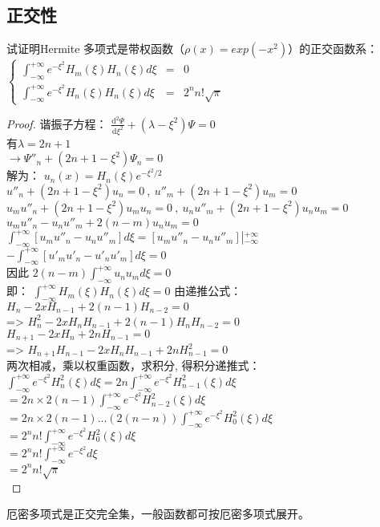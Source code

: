 \subsection{正交性}
\begin{example} %
试证明Hermite 多项式是带权函数（$\rho(x) =exp(-x^2)$）的正交函数系：\\
{$ \displaystyle  
	\left\{  
	\begin{array}{ccccc}
		\int_{-\infty}^{+\infty} e^{-\xi^{2}} H_m(\xi) H_n(\xi)d\xi &=&0 ~~~~~~\\
		\int_{-\infty}^{+\infty} e^{-\xi^{2}} H_n(\xi) H_n(\xi)d\xi &=&2^n n! \sqrt{\pi}  
	\end{array}
	\right.  
	$} 
\end{example} 
\begin{proof} %
谐振子方程：{ $ \displaystyle \frac{\mathrm{d} ^2\Psi}{\mathrm{d} \xi^2} + \left( \lambda - \xi^2 \right) \Psi=0  $  }  \\
有$\lambda=2n+1 $~\\
$\to   \Psi''_n +(2n+1-\xi^2) \Psi_n =0$ \\
解为： $u_n(x)=H_n(\xi) e^{-\xi^{2}/2}$ \\
$u''_n+ (2n+1-\xi^2) u_n =0    ~, ~u''_m+ (2n+1-\xi^2) u_m =0  $\\
$u_mu''_n +(2n+1-\xi^2) u_mu_n =0    ~, ~u_nu''_m + (2n+1-\xi^2) u_nu_m =0  $  \\ 
$u_mu''_n -u_nu''_m +2(n-m)u_nu_m=0 $\\ 
$ \int_{-\infty}^{+\infty} [u_mu''_n -u_nu''_m] d\xi  = [u_mu''_n -u_nu''_m] \left |_{-\infty} ^{+\infty}  \right. $
$-\int_{-\infty}^{+\infty} [u'_mu'_n -u'_nu'_m] d\xi =0$\\ 
因此	$ 2(n-m) \int_{-\infty}^{+\infty} u_nu_m d\xi =0$ \\ 
即：{ $ \int_{-\infty}^{+\infty}  H_m(\xi) H_n(\xi)d\xi =0 $ }	
由递推公式：\\
{$H_{n} -2xH_{n-1} +2(n-1)H_{n-2} =0  $ } \\
=> 	{ $H^2_{n}-2xH_n H_{n-1}+2(n-1) H_n H_{n-2} =0  $ }\\ 
{$H_{n+1} -2xH_{n} +2nH_{n-1} =0  $ } \\
=>   { $H_{n+1} H_{n-1}-2xH_{n} H_{n-1}+2nH^2_{n-1} =0  $ } \\
两次相减，乘以权重函数，求积分, 得积分递推式：\\
{$\int_{-\infty}^{+\infty} e^{-\xi^2} H^2 _n(\xi) d\xi =2n \int_{-\infty}^{+\infty} e^{-\xi^{2}} H^2 _{n-1}(\xi) d\xi$ }\\
$= 2n \times 2(n-1) \int_{-\infty}^{+\infty} e^{-\xi^{2}} H^2 _{n-2}(\xi) d\xi$  \\
 $= 2n \times 2(n-1) ... (2(n-n)) \int_{-\infty}^{+\infty} e^{-\xi^{2}} H^2 _{0}(\xi) d\xi$  \\
 $= 2^n n! \int_{-\infty}^{+\infty} e^{-\xi^{2}} H^2 _{0}(\xi) d\xi$  \\	
$= 2^n n! \int_{-\infty}^{+\infty} e^{-\xi^{2}} d\xi$  \\	
 $= 2^n n! \sqrt{\pi} $ \\	
\end{proof} %
\begin{remark}
厄密多项式是正交完全集，一般函数都可按厄密多项式展开。
\end{remark}

